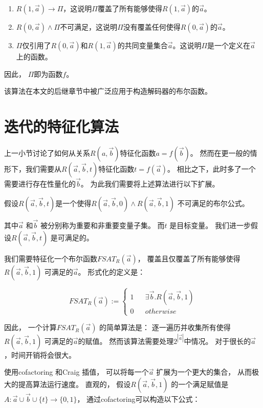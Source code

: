 \begin{enumerate}
\item $R(1,\vec{a})\to \Pi$，这说明$\Pi$覆盖了所有能够使得$R(1,\vec{a})$的$\vec{a}$。
\item $R(0,\vec{a})\wedge \Pi$不可满足，这说明$\Pi$没有覆盖任何使得$R(0,\vec{a})$的$\vec{a}$。
\item $\Pi$仅引用了$R(0,\vec{a})$和$R(1,\vec{a})$的共同变量集合$\vec{a}$。这说明$\Pi$是一个定义在$\vec{a}$上的函数。
\end{enumerate}

因此，
$\Pi$即为函数$f$。

该算法在本文的后继章节中被广泛应用于构造解码器的布尔函数。


\section{迭代的特征化算法}\label{sec_iterativecraig}
上一小节讨论了如何从关系$R(a,\vec{b})$特征化函数$a=f(\vec{b})$。
然而在更一般的情形下，我们需要从$R(\vec{a},\vec{b},t)$特征化函数$t=f(\vec{a})$。
相比之下，此时多了一个需要进行存在性量化的$\vec{b}$。
为此我们需要将上述算法进行以下扩展。

假设$R(\vec{a},\vec{b},t)$是一个使得$R(\vec{a},\vec{b},0)\wedge R(\vec{a},\vec{b},1)$ 不可满足的布尔公式。

其中$\vec{a}$ 和$\vec{b}$ 被分别称为重要和非重要变量子集。
而$t$ 是目标变量。
我们进一步假设$R(\vec{a},\vec{b},t)$ 是可满足的。

我们需要特征化一个布尔函数$FSAT_R(\vec{a})$，
覆盖且仅覆盖了所有能够使得$R(\vec{a},\vec{b},1)$ 可满足的$\vec{a}$。
形式化的定义是：

\begin{equation}\label{fchar}
FSAT_R(\vec{a}):=
\left\{
\begin{array}{rcl}
1 & & \exists\vec{b}.R(\vec{a},\vec{b},1) \\
0 & & otherwise
\end{array}
\right.
\end{equation}

因此，
一个计算$FSAT_R(\vec{a})$ 的简单算法是：
逐一遍历并收集所有使得$R(\vec{a},\vec{b},1)$ 可满足的$\vec{a}$的赋值。
然而该算法需要处理$2^{|\vec{a}|}$中情况。
对于很长的$\vec{a}$，时间开销将会很大。

使用cofactoring  和Craig 插值，
可以将每一个$\vec{a}$ 扩展为一个更大的集合，
从而极大的提高算法运行速度。
直观的，
假设$R(\vec{a},\vec{b},1)$ 的一个满足赋值是$A:\vec{a}\cup\vec{b}\cup\{t\}\to\{0,1\}$，
通过cofactoring可以构造以下公式：


